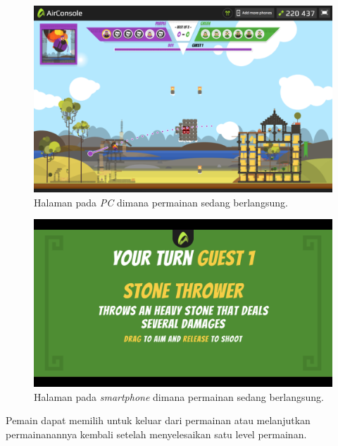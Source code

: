 \begin{figure}[H]
	\centering
	\includegraphics[scale=0.2]{Gambar/con7_play5}
	\caption{Halaman pada \textit{PC} dimana permainan sedang berlangsung.}
	\label{fig:25_con7_play5}
\end{figure}

\begin{figure}[H]
	\centering
	\includegraphics[scale=0.2]{Gambar/air7_play4}
	\caption{Halaman pada \textit{smartphone} dimana permainan sedang berlangsung.}
	\label{fig:26_air7_play4}
\end{figure}

Pemain dapat memilih untuk keluar dari permainan atau melanjutkan permainanannya kembali setelah menyelesaikan satu level permainan.

